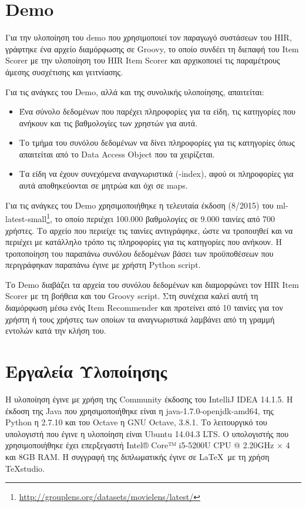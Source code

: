 \section{ \en Demo}
Για την υλοποίηση του {\en demo} που χρησιμοποιεί τον παραγωγό συστάσεων του {\en HIR}, γράφτηκε ένα αρχείο διαμόρφωσης σε {\en Groovy}, το οποίο συνδέει τη διεπαφή του {\en Item Scorer} με την υλοποίηση του {\en HIR Item Scorer} και αρχικοποιεί τις παραμέτρους άμεσης συσχέτισης και γειτνίασης. \par
Για τις ανάγκες του {\en Demo}, αλλά και της συνολικής υλοποίησης, απαιτείται:
\begin{itemize}
\item Ένα σύνολο δεδομένων που παρέχει πληροφορίες για τα είδη, τις κατηγορίες που ανήκουν και τις βαθμολογίες των χρηστών για αυτά.
\item Το τμήμα του συνόλου δεδομένων να δίνει πληροφορίες για τις κατηγορίες όπως απαιτείται από το {\en Data Access Object} που τα χειρίζεται.
\item Τα είδη να έχουν συνεχόμενα αναγνωριστικά ({-index}), αφού οι πληροφορίες για αυτά αποθηκεύονται σε μητρώα και όχι σε {\en maps}.
\end{itemize}\par
Για τις ανάγκες του {\en Demo} χρησιμοποιήθηκε η τελευταία έκδοση (8/2015) του {\en ml-latest-small}\footnote{\en \url{http://grouplens.org/datasets/movielens/latest/}}, το οποίο περιέχει 100.000 βαθμολογίες σε 9.000 ταινίες από 700 χρήστες. Το αρχείο που περιείχε τις ταινίες αντιγράφηκε, ώστε να τροποιηθεί και να περιέχει με κατάλληλο τρόπο τις πληροφορίες για τις κατηγορίες που ανήκουν. Η τροποποίηση του παραπάνω συνόλου δεδομένων βάσει των προϋποθέσεων που περιγράφηκαν παραπάνω έγινε με χρήστη {\en Python script}.\par
Το {\en Demo} διαβάζει τα αρχεία του συνόλου δεδομένων και διαμορφώνει τον {\en HIR Item Scorer} με τη βοήθεια και του {\en Groovy script}. Στη συνέχεια καλεί αυτή τη διαμόρφωση μέσω ενός {\en Item Recommender} και προτείνει από 10 ταινίες για τον χρήστη ή τους χρήστες των οποίων τα αναγνωριστικά λαμβάνει από τη γραμμή εντολών κατά την κλήση του. 
\section{Εργαλεία Υλοποίησης}
Η υλοποίηση έγινε με χρήση της {\en Community} έκδοσης του {\en IntelliJ IDEA 14.1.5}. Η έκδοση της {\en Java} που χρησιμοποιήθηκε είναι η {\en java-1.7.0-openjdk-amd64}, της {\en Python} η 2.7.10 και του {\en Octave} η {\en GNU Octave, 3.8.1}. Το λειτουργικό του υπολογιστή που έγινε η υλοποίηση είναι {\en Ubuntu 14.04.3 LTS}. Ο υπολογιστής που χρησιμοποιήθηκε έχει επερξεγαστή {\en Intel® Core™ i5-5200U CPU @ 2.20GHz × 4} και 8{\en GB RAM.} Η συγγραφή της διπλωματικής έγινε σε \LaTeX\ με τη χρήση {\en TeXstudio}.